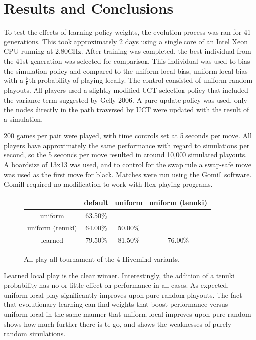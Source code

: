\documentclass[11pt]{report}
\begin{document}
\section{Results and Conclusions}\label{results}
To test the effects of learning policy weights, the evolution process was ran for 41 generations. This took approximately 2 days using a single core of an Intel Xeon CPU running at 2.80GHz. After training was completed, the best individual from the 41st generation was selected for comparison. This individual was used to bias the simulation policy and compared to the uniform local bias, uniform local bias with a $\frac{5}{6}$th probability of playing locally. The control consisted of uniform random playouts. All players used a slightly modified UCT selection policy that included the variance term suggested by Gelly 2006\cite{gelly2006exploration}. A pure update policy was used, only the nodes directly in the path traversed by UCT were updated with the result of a simulation.

200 games per pair were played, with time controls set at 5 seconds per move. All players have approximately the same performance with regard to simulations per second, so the 5 seconds per move resulted in around 10,000 simulated playouts. A boardsize of 13x13 was used, and to control for the swap rule a swap-safe move was used as the first move for black. Matches were run using the Gomill software\cite{gomill}. Gomill required no modification to work with Hex playing programs.

\begin{figure}
	\begin{center}
		\begin{tabular}{c | c c c}
		 & default & uniform & uniform (tenuki) \\
		\hline
		uniform & 63.50\% & & \\
		uniform (tenuki) & 64.00\% & 50.00\% & \\
		learned & 79.50\% & 81.50\% & 76.00\% \\
		\end{tabular}
	\end{center}
	\caption{All-play-all tournament of the 4 Hivemind variants.}
	\label{fig:results}
\end{figure}

Learned local play is the clear winner. Interestingly, the addition of a tenuki probability has no or little effect on performance in all cases. As expected, uniform local play significantly improves upon pure random playouts. The fact that evolutionary learning can find weights that boost performance versus uniform local in the same manner that uniform local improves upon pure random shows how much further there is to go, and shows the weaknesses of purely random simulations.
\end{document}
